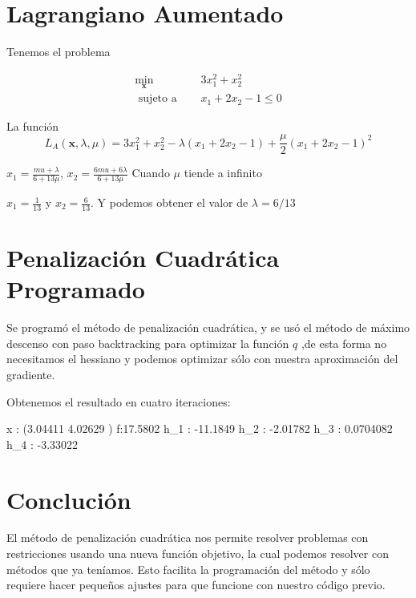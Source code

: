 \documentclass{article}
\begin{document}
\begin{multicols}{2}
\section*{Lagrangiano Aumentado}

Tenemos el problema

\begin{align*}
\min_{\boldsymbol{x}}&\quad 3x_1^2 + x_2^2\\
\text{ sujeto a }&\quad x_1+2x_2 - 1 \leq 0
\end{align*}

La función
$$L_A(\boldsymbol{x}, \lambda, \mu) = 3x_1^2 + x_2^2 - \lambda(x_1+2x_2 - 1) + \frac{\mu}{2}(x_1+2x_2 - 1)^2$$

$x_1 = \frac{mu + \lambda}{6+13\mu}$, $x_2 = \frac{6mu + 6\lambda}{6+13\mu}$ Cuando $\mu$ tiende a infinito

$x_1 = \frac{1}{13}$ y $x_2 = \frac{6}{13}$. Y podemos obtener el valor de $\lambda = 6/13$

\section*{Penalización Cuadrática Programado}

Se programó el método de penalización cuadrática, y se usó el método de máximo descenso con paso backtracking para optimizar la función $q$ ,de esta forma no necesitamos el hessiano y podemos optimizar sólo con nuestra aproximación del gradiente.

Obtenemos el resultado en cuatro iteraciones:

x : (3.04411 4.02629 )   f:17.5802  h\_1 : -11.1849  h\_2 : -2.01782  h\_3 : 0.0704082 h\_4 : -3.33022

\section*{Conclución}
El método de penalización cuadrática nos permite resolver problemas con restricciones usando una nueva función objetivo, la cual podemos resolver con métodos que ya teníamos. Esto facilita la programación del método y sólo requiere hacer pequeños ajustes para que funcione con nuestro código previo.
\newpage

\end{multicols}
\end{document}
